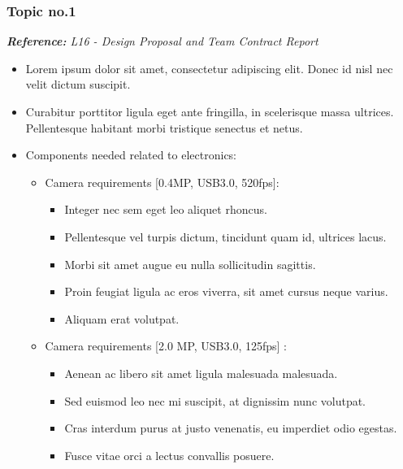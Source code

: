 \documentclass[11pt,letterpaper]{article}
\begin{document}
\subsubsection{Topic no.1}
\textit{\footnotesize{\textbf{Reference:} L16 - Design Proposal and Team Contract Report}} 
\begin{itemize} %
	\item Lorem ipsum dolor sit amet, consectetur adipiscing elit. Donec id nisl nec velit dictum suscipit. 
	\item Curabitur porttitor ligula eget ante fringilla, in scelerisque massa ultrices. Pellentesque habitant morbi tristique senectus et netus.
	\item Components needed related to electronics:
	\begin{itemize}[label=$-$] %
		\item Camera requirements [0.4MP, USB3.0, 520fps]: 
			\begin{itemize} %
			\item Integer nec sem eget leo aliquet rhoncus.
			\item Pellentesque vel turpis dictum, tincidunt quam id, ultrices lacus.
			\item Morbi sit amet augue eu nulla sollicitudin sagittis.
			\item Proin feugiat ligula ac eros viverra, sit amet cursus neque varius. 
			\item Aliquam erat volutpat.
			\end{itemize}
			
		\item Camera requirements [2.0 MP, USB3.0, 125fps] : 
			\begin{itemize} %
			\item Aenean ac libero sit amet ligula malesuada malesuada.
			\item Sed euismod leo nec mi suscipit, at dignissim nunc volutpat.
			\item Cras interdum purus at justo venenatis, eu imperdiet odio egestas.
			\item Fusce vitae orci a lectus convallis posuere.
			\end{itemize}
	\end{itemize}
\end{itemize}
\end{document}
